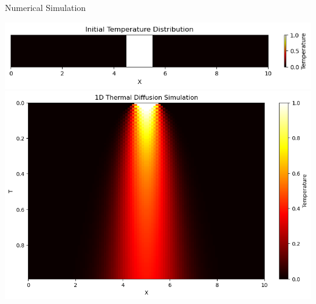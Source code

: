 \begin{secframe}
\small
\textcolor{red_unipd}{\Large Numerical Simulation}
\vspace{0.6em}

\centering
\begin{minipage}[b]{0.80\linewidth}
    \includegraphics[width=\linewidth,keepaspectratio]{images/1DThemal/init.png}
    \includegraphics[width=\linewidth,keepaspectratio]{images/1DThemal/diffusion.png}
\end{minipage}

\end{secframe}



